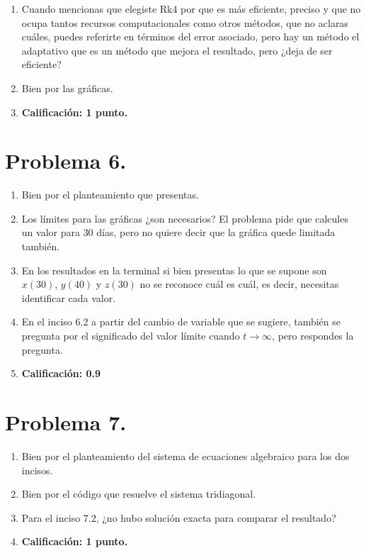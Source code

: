 \begin{enumerate}
\item Cuando mencionas que elegiste Rk4 por que es más eficiente, preciso y que no ocupa tantos recursos computacionales como otros métodos, que no aclaras cuáles, puedes referirte en términos del error asociado, pero hay un método el adaptativo que es un método que mejora el resultado, pero ¿deja de ser eficiente?
\item Bien por las gráficas.
\item \textbf{Calificación: 1 punto.}
\end{enumerate}

\section{Problema 6.}

\begin{enumerate}
\item Bien por el planteamiento que presentas.
\item Los límites para las gráficas ¿son necesarios? El problema pide que calcules un valor para $30$ días, pero no quiere decir que la gráfica quede limitada también.
\item En los resultados en la terminal si bien presentas lo que se supone son $x (30)$, $y (40)$ y $z (30)$ no se reconoce cuál es cuál, es decir, necesitas identificar cada valor.
\item En el inciso 6.2 a partir del cambio de variable que se sugiere, también se pregunta por el significado del valor límite cuando $t \to \infty$, pero respondes la pregunta.
\item \textbf{Calificación: 0.9}
\end{enumerate}

\section{Problema 7.}

\begin{enumerate}
\item Bien por el planteamiento del sistema de ecuaciones algebraico para los dos incisos.
\item Bien por el código que resuelve el sistema tridiagonal.
\item Para el inciso 7.2, ¿no hubo solución exacta para comparar el resultado?
\item \textbf{Calificación: 1 punto.}
\end{enumerate}

